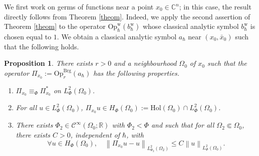 \documentclass{article}
\newtheorem{prop}[theo]{Proposition}
\newcommand{\Op}{\mathrm{Op}}
\newcommand{\Hol}{\mathrm{Hol}}
\newcommand{\Brg}{\mathrm{Brg}}
\newcommand{\w}{\mathrm{w}}
\newcommand{\norm}[1]{\left\|#1\right\|}
\newcommand{\Opbrg}{\Op^{\Brg}}
\newcommand{\lphi}{L^2_\Phi}
\newcommand{\Cinf}{\mathscr{C}^\infty}
\newcommand{\RM}{\mathbb{R}}
\newcommand{\CM}{\mathbb{C}}
\newcommand{\h}{\hbar}
\begin{document}
We first work on germs of functions near a point $x_0\in\CM^n$; in
this case, the result directly follows from Theorem
\ref{theom}. Indeed, we apply the second assertion of Theorem
\ref{theom} to the operator $ \Op^{\w}_\h(b_{ \hbar}^{\w})$ whose
classical analytic symbol $b_{ \hbar}^{\w}$ is chosen equal to $1$. We
obtain a classical analytic symbol $a_\h$ near $(x_0,\bar x_0)$ such
that the following holds. \begin{prop}
  \label{prop:pi_x0} There exists $r>0$ and a neighbourhood $\Omega_0$
  of $x_0$ such that the operator $\Pi_{x_0}:=\Opbrg_r(a_\h)$ has the
  following properties.
  \begin{enumerate}
  \item \label{item:pi_x0:selfadjoint}
    $\Pi_{x_0}\equiv_\Phi \Pi_{x_0}^*$ on $\lphi(\Omega_0)$.
  \item \label{item:pi_x0:holomo} For all $u\in \lphi(\Omega_0)$,
    $\Pi_{x_0}u \in H_\Phi(\Omega_0):=\Hol(\Omega_0)\cap
    \lphi(\Omega_0)$.
  \item \label{item:pi_x0:repro} There exists
    $\Phi_2\in\Cinf(\Omega_0;\RM)$ with $\Phi_2<\Phi$ and such that
    for all $\Omega_2\Subset \Omega_0$, there exists $C>0$,
    independent of $\h$, with
    \begin{equation}
      \forall u\in H_\Phi(\Omega_0), \quad 
      \norm{\Pi_{x_0} u - u}_{L^2_{\Phi_2}(\Omega_2)} \leq C \norm{u}_{\lphi(\Omega_0)}.
    \end{equation}
  \end{enumerate}
\end{prop}
\end{document}
